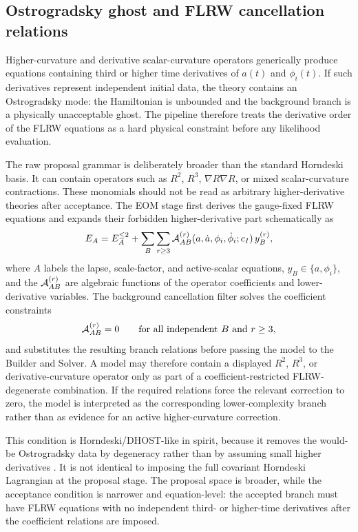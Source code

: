 \documentclass[aps,prd,twocolumn,superscriptaddress,nofootinbib,longbibliography]{revtex4-2}
\begin{document}
\subsection{Ostrogradsky ghost and FLRW cancellation relations}
\label{subsec:ostro}

Higher-curvature and derivative scalar-curvature operators generically produce equations containing third or higher time derivatives of $a(t)$ and $\phi_i(t)$.  If such derivatives represent independent initial data, the theory contains an Ostrogradsky mode: the Hamiltonian is unbounded and the background branch is a physically unacceptable ghost\cite{Ostrogradsky1850}.  The pipeline therefore treats the derivative order of the FLRW equations as a hard physical constraint before any likelihood evaluation.

The raw proposal grammar is deliberately broader than the standard Horndeski basis.  It can contain operators such as $R^2$, $R^3$, $\nabla R\nabla R$, or mixed scalar-curvature contractions.  These monomials should not be read as arbitrary higher-derivative theories after acceptance.  The EOM stage first derives the gauge-fixed FLRW equations and expands their forbidden higher-derivative part schematically as
\begin{equation}
E_A=E_A^{\leq 2}+
\sum_{B}\sum_{r\geq 3}{\cal A}_{AB}^{(r)}(a,\dot a,\phi_i,\dot\phi_i;c_I)
\,y_B^{(r)},
\label{eq:forbidden-derivatives}
\end{equation}
where $A$ labels the lapse, scale-factor, and active-scalar equations, $y_B\in\{a,\phi_i\}$, and the ${\cal A}_{AB}^{(r)}$ are algebraic functions of the operator coefficients and lower-derivative variables.  The background cancellation filter solves the coefficient constraints
\begin{equation}
{\cal A}_{AB}^{(r)}=0
\qquad
\hbox{for all independent }B\hbox{ and }r\geq 3,
\label{eq:cancellation-relations}
\end{equation}
and substitutes the resulting branch relations before passing the model to the Builder and Solver.  A model may therefore contain a displayed $R^2$, $R^3$, or derivative-curvature operator only as part of a coefficient-restricted FLRW-degenerate combination.  If the required relations force the relevant correction to zero, the model is interpreted as the corresponding lower-complexity branch rather than as evidence for an active higher-curvature correction.

This condition is Horndeski/DHOST-like in spirit, because it removes the would-be Ostrogradsky data by degeneracy rather than by assuming small higher derivatives \cite{Horndeski1974,Langlois2016DHOST}.  It is not identical to imposing the full covariant Horndeski Lagrangian at the proposal stage.  The proposal space is broader, while the acceptance condition is narrower and equation-level: the accepted branch must have FLRW equations with no independent third- or higher-time derivatives after the coefficient relations are imposed.
\end{document}

